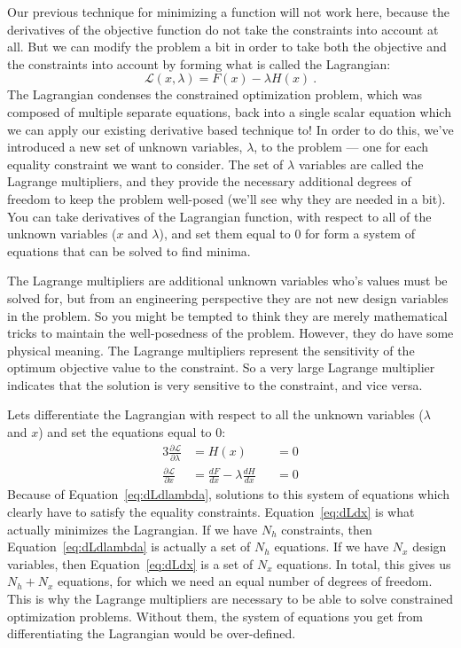\documentclass[conf]{new-aiaa}
\begin{document}
        Our previous technique for minimizing a function will not work here, because the derivatives of the objective function do not take the constraints into account at all. 
        But we can modify the problem a bit in order to take both the objective and the constraints into account by forming what is called the Lagrangian:  
        \begin{equation}
            \mathcal{L}(x, \lambda) = F(x) - \lambda H(x) \ .
        \end{equation}
        The Lagrangian condenses the constrained optimization problem, which was composed of multiple separate equations, back into a single scalar equation which we can apply our existing derivative based technique to! 
        In order to do this, we've introduced a new set of unknown variables, $\lambda$, to the problem --- one for each equality constraint we want to consider. 
        The set of $\lambda$ variables are called the Lagrange multipliers, and they provide the necessary additional degrees of freedom to keep the problem well-posed (we'll see why they are needed in a bit). 
        You can take derivatives of the Lagrangian function, with respect to all of the unknown variables ($x$ and $\lambda$), and set them equal to 0 for form a system of equations that can be solved to find minima. 


        The Lagrange multipliers are additional unknown variables who's values must be solved for, but from an engineering perspective they are not new design variables in the problem. 
        So you might be tempted to think they are merely mathematical tricks to maintain the well-posedness of the problem. 
        However, they do have some physical meaning. 
        The Lagrange multipliers represent the sensitivity of the optimum objective value to the constraint. 
        So a very large Lagrange multiplier indicates that the solution is very sensitive to the constraint, and vice versa. 


        Lets differentiate the Lagrangian with respect to all the unknown variables ($\lambda$ and $x$) and set the equations equal to 0: 
        \begin{alignat}{3}
            \frac{\partial \mathcal{L}}{\partial \lambda} &= H(x) &&= 0 \label{eq:dLdlambda} \\
            \frac{\partial \mathcal{L}}{\partial x} &= \frac{dF}{dx} - \lambda \frac{dH}{dx} &&= 0 \label{eq:dLdx}
        \end{alignat}
        Because of Equation~\eqref{eq:dLdlambda}, solutions to this system of equations which clearly have to satisfy the equality constraints. 
        Equation~\eqref{eq:dLdx} is what actually minimizes the Lagrangian.
        If we have $N_h$ constraints, then  Equation~\eqref{eq:dLdlambda} is actually a set of $N_h$ equations. 
        If we have $N_x$ design variables, then Equation~\eqref{eq:dLdx} is a set of $N_x$ equations. 
        In total, this gives us $N_h + N_x$ equations, for which we need an equal number of degrees of freedom. 
        This is why the Lagrange multipliers are necessary to be able to solve constrained optimization problems. 
        Without them, the system of equations you get from differentiating the Lagrangian would be over-defined. 
\end{document}
